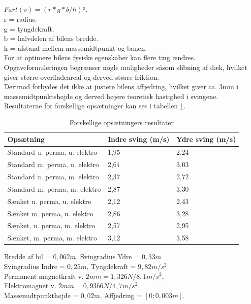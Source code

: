 \( Fart(v) = (r*g*b/h)^\frac{1}{2} \), \\
r = radius.\\
g = tyngdekraft. \\
b = halvdelen af bilens bredde. \\
h = afstand mellem massemidtpunkt og banen. \\

For at optimere bilens fysiske egenskaber kan flere ting ændres. Opgaveformuleringen begrænser nogle muligheder såsom slibning af dæk, hvilket giver større overfladeareal og derved større friktion. \\

Derimod forbydes det ikke at justere bilens affjedring, hvilket giver ca. 3mm i massemidtpunktshøjde og derved højere teoretisk hastighed i svingene. Resultaterne for forskellige opsætninger kan ses i tabellen \ref{forskel_opsaat_result}. \\

\begin{table}[H]
\centering
\begin{tabular}{|l|l|l|}
\hline
Opsætning                      & Indre sving (m/s) & Ydre sving (m/s) \\ \hline
Standard u. perma,  u. elektro & 1,95              & 2,24             \\ \hline
Standard m. perma, u. elektro  & 2,64              & 3,03             \\ \hline
Standard u. perma, m. elektro  & 2,37              & 2,72             \\ \hline
Standard m. perma, m. elektro  & 2,87              & 3,30             \\ \hline
Sænket u. perma, u. elektro    & 2,12              & 2,43             \\ \hline
Sænket m. perma, u. elektro    & 2,86              & 3,28             \\ \hline
Sænket, u. perma, m. elektro   & 2,57              & 2,95             \\ \hline
Sænket, m. perma, m. elektro   & 3,12              & 3,58             \\ \hline
\end{tabular}
\caption{Forskellige opsætningers resultater}
\label{forskel_opsaat_result}
\end{table} 

Bredde af bil = \( 0,062m \), Svingradius Ydre = \( 0,33m \) \\
Svingradius Indre = \( 0,25m \), Tyngdekraft = \( 9,82m/s^2 \) \\
Permanent magnetkraft v. \( 2mm = 1,326N/8,1 m/s^2 \), \\
Elektromagnet v. \( 2mm = 0,9366N/4,7 m/s^2. \) \\  
Massemidtpunkthøjde = \( 0,02m \), Affjedring = \( [0;0,003m]. \) \\

